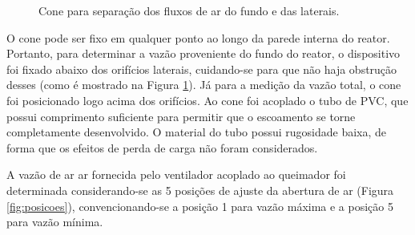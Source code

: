 \begin{figure}[!ht]
	\centering
	\caption{Cone para separação dos fluxos de ar do fundo e das laterais.}
	\label{fig:cone}
\end{figure}

O cone pode ser fixo em qualquer ponto ao longo da parede interna do reator. Portanto, para determinar a vazão proveniente do fundo do reator, o dispositivo foi fixado abaixo dos orifícios laterais, cuidando-se para que não haja obstrução desses (como é mostrado na Figura \ref{fig:cone}). Já para a medição da vazão total, o cone foi posicionado logo acima dos orifícios. Ao cone foi acoplado o tubo de PVC, que possui comprimento suficiente para permitir que o escoamento se torne completamente desenvolvido. O material do tubo possui rugosidade baixa, de forma que os efeitos de perda de carga não foram considerados.

A vazão de ar ar fornecida pelo ventilador acoplado ao queimador foi determinada considerando-se as 5 posições de ajuste da abertura de ar (Figura \ref{fig:posicoes}), convencionando-se a posição 1 para vazão máxima e a posição 5 para vazão mínima.

